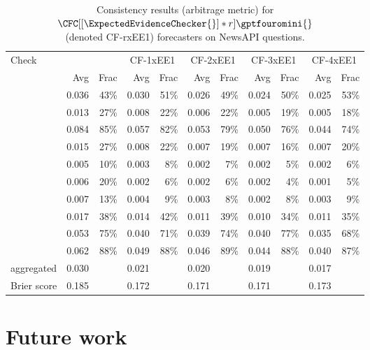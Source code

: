{\begin{table}[htbp]
\caption{Consistency results (arbitrage metric) for $\CFC[[\ExpectedEvidenceChecker{}]*r]{\gptfouromini{}}$ \\(denoted CF-rxEE1) forecasters on NewsAPI questions.}
\begin{tabular}{lrrrrrrrrrr}
\toprule
Check & \multicolumn{2}{c}{\gptfouromini{}} & \multicolumn{2}{c}{CF-1xEE1} & \multicolumn{2}{c}{CF-2xEE1} & \multicolumn{2}{c}{CF-3xEE1} & \multicolumn{2}{c}{CF-4xEE1} \\
 & Avg & Frac & Avg & Frac & Avg & Frac & Avg & Frac & Avg & Frac \\
\midrule
\NegChecker{} & 0.036 & 43\% & 0.030 & 51\% & 0.026 & 49\% & 0.024 & 50\% & 0.025 & 53\% \\
\ParaphraseChecker{} & 0.013 & 27\% & 0.008 & 22\% & 0.006 & 22\% & 0.005 & 19\% & 0.005 & 18\% \\
\CondCondChecker{} & 0.084 & 85\% & 0.057 & 82\% & 0.053 & 79\% & 0.050 & 76\% & 0.044 & 74\% \\
\ExpectedEvidenceChecker{} & 0.015 & 27\% & 0.008 & 22\% & 0.007 & 19\% & 0.007 & 16\% & 0.007 & 20\% \\
\ConsequenceChecker{} & 0.005 & 10\% & 0.003 & 8\% & 0.002 & 7\% & 0.002 & 5\% & 0.002 & 6\% \\
\AndChecker{} & 0.006 & 20\% & 0.002 & 6\% & 0.002 & 6\% & 0.002 & 4\% & 0.001 & 5\% \\
\OrChecker{} & 0.007 & 13\% & 0.004 & 9\% & 0.003 & 8\% & 0.002 & 8\% & 0.003 & 9\% \\
\AndOrChecker{} & 0.017 & 38\% & 0.014 & 42\% & 0.011 & 39\% & 0.010 & 34\% & 0.011 & 35\% \\
\ButChecker{} & 0.053 & 75\% & 0.040 & 71\% & 0.039 & 74\% & 0.040 & 77\% & 0.035 & 68\% \\
\CondChecker{} & 0.062 & 88\% & 0.049 & 88\% & 0.046 & 89\% & 0.044 & 88\% & 0.040 & 87\% \\
aggregated & 0.030 &  & 0.021 &  & 0.020 &  & 0.019 &  & 0.017 &  \\
Brier score & 0.185 &  & 0.172 &  & 0.171 &  & 0.171 &  & 0.173 &  \\
\bottomrule
\end{tabular}
\label{cfc:tab:cf-ee}
\end{table}
}

\section{Future work}
\label{cfc:sec:future-work}

